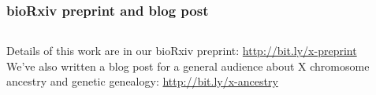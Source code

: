 \documentclass[hyperref={colorlinks = true,
                         urlcolor = blue,
                         linkcolor = blue}]{beamer}
\begin{document}
\begin{frame}
  \frametitle{bioRxiv preprint and blog post}
  \begin{columns}[c]
    \begin{column}{.6\textwidth}

      Details of this work are in our bioRxiv preprint: \url{http://bit.ly/x-preprint} \\[4em]

      We've also written a blog post for a general audience about X chromosome
      ancestry and genetic genealogy: \url{http://bit.ly/x-ancestry}

    \end{column}
    \begin{column}{.4\textwidth}
    \end{column}
 
  \end{columns}
\end{frame}
\end{document}

